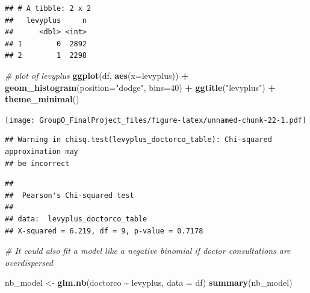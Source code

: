 \documentclass[
]{article}
\newenvironment{Shaded}{\begin{snugshade}}{\end{snugshade}}
\newcommand{\AttributeTok}[1]{\textcolor[rgb]{0.13,0.29,0.53}{#1}}
\newcommand{\CommentTok}[1]{\textcolor[rgb]{0.56,0.35,0.01}{\textit{#1}}}
\newcommand{\DecValTok}[1]{\textcolor[rgb]{0.00,0.00,0.81}{#1}}
\newcommand{\FunctionTok}[1]{\textcolor[rgb]{0.13,0.29,0.53}{\textbf{#1}}}
\newcommand{\NormalTok}[1]{#1}
\newcommand{\OtherTok}[1]{\textcolor[rgb]{0.56,0.35,0.01}{#1}}
\newcommand{\SpecialCharTok}[1]{\textcolor[rgb]{0.81,0.36,0.00}{\textbf{#1}}}
\newcommand{\StringTok}[1]{\textcolor[rgb]{0.31,0.60,0.02}{#1}}
\begin{document}
\begin{verbatim}
## # A tibble: 2 x 2
##   levyplus     n
##      <dbl> <int>
## 1        0  2892
## 2        1  2298
\end{verbatim}

\begin{Shaded}
\begin{Highlighting}[]
\CommentTok{\# plot of levyplus}
\FunctionTok{ggplot}\NormalTok{(df, }\FunctionTok{aes}\NormalTok{(}\AttributeTok{x=}\NormalTok{levyplus)) }\SpecialCharTok{+}
  \FunctionTok{geom\_histogram}\NormalTok{(}\AttributeTok{position=}\StringTok{"dodge"}\NormalTok{, }\AttributeTok{bins=}\DecValTok{40}\NormalTok{) }\SpecialCharTok{+}
  \FunctionTok{ggtitle}\NormalTok{(}\StringTok{"levyplus"}\NormalTok{) }\SpecialCharTok{+}
  \FunctionTok{theme\_minimal}\NormalTok{()}
\end{Highlighting}
\end{Shaded}

\texttt{[image: GroupO\_FinalProject\_files/figure-latex/unnamed-chunk-22-1.pdf]}

\begin{Shaded}
\end{Shaded}

\begin{verbatim}
## Warning in chisq.test(levyplus_doctorco_table): Chi-squared approximation may
## be incorrect
\end{verbatim}

\begin{verbatim}
## 
##  Pearson's Chi-squared test
## 
## data:  levyplus_doctorco_table
## X-squared = 6.219, df = 9, p-value = 0.7178
\end{verbatim}

\begin{Shaded}
\begin{Highlighting}[]
\CommentTok{\# It could also fit a model like a negative binomial if doctor consultations are overdispersed}

\NormalTok{nb\_model }\OtherTok{\textless{}{-}} \FunctionTok{glm.nb}\NormalTok{(doctorco }\SpecialCharTok{\textasciitilde{}}\NormalTok{ levyplus, }\AttributeTok{data =}\NormalTok{ df)}
\FunctionTok{summary}\NormalTok{(nb\_model)}
\end{Highlighting}
\end{Shaded}
\end{document}
